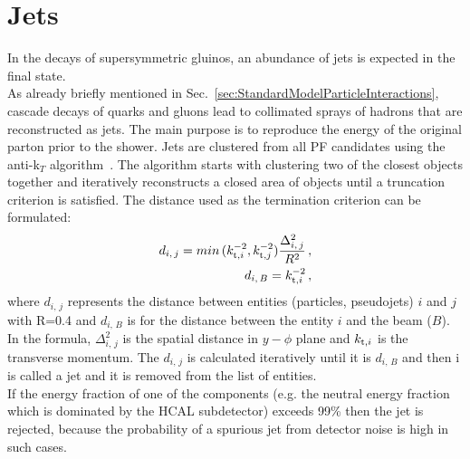 \section{Jets}
\label{sec:PFJET}
In the decays of supersymmetric gluinos, an abundance of jets is expected in the final state.\\
As already briefly mentioned in Sec.~\ref{sec:StandardModelParticleInteractions}, cascade decays of quarks and gluons lead to collimated sprays of hadrons that are reconstructed as jets. The main purpose is to reproduce the energy of the original parton prior to the shower. Jets are clustered from all PF candidates using the anti-k$_T$ algorithm~\cite{antiKT}. 
The algorithm starts with clustering two of the closest objects together and iteratively reconstructs a closed area of objects until a truncation criterion is satisfied.
The distance used as the termination criterion can be formulated:
\begin{eqnarray}
{d_{i,\,j} =  min\,(k^{-2}_{{\rm t},i},k^{-2}_{{\rm t},j})\frac{\Delta^2_{i,\,j}}{R^2}}\,,\\
{d_{i,\,B}} = k^{-2}_{{\rm t},i}\,,
\end{eqnarray}
where $d_{i,\,j}$ represents the distance between entities (particles, pseudojets) $i$ and $j$ with R=0.4 and $d_{i,\,B}$ is for the distance between the entity $i$ and the beam ($B$). In the formula, $\Delta^2_{i,\,j}$ is the spatial distance in $y-\phi$ plane and $k_{{\rm t},i}$ is the transverse momentum. The $d_{i,\,j}$ is calculated iteratively until it is $d_{i,\,B}$ and then i is called a jet and it is removed from the list of entities. \\
If the energy fraction of one of the components (e.g. the neutral energy fraction which is dominated by the HCAL subdetector) exceeds 99\% then the jet is rejected, because the probability of a spurious jet from detector noise is high in such cases.\\
